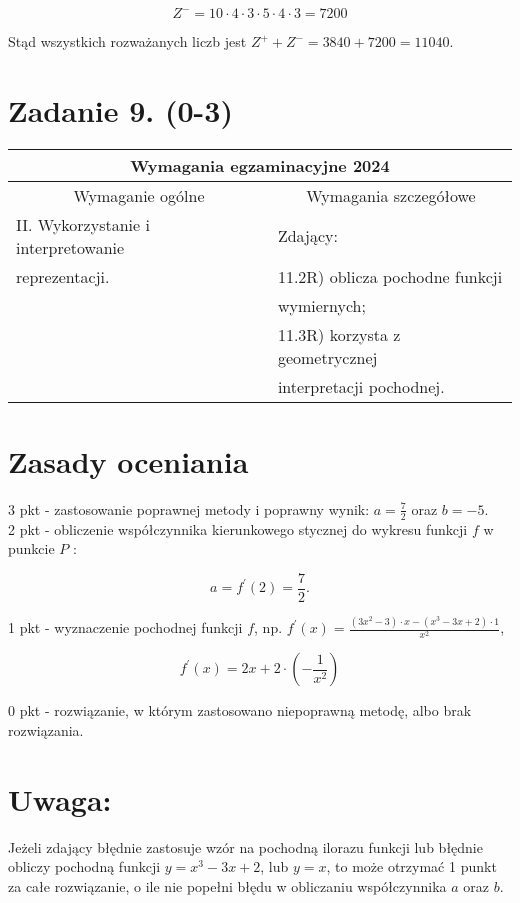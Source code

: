 \documentclass[10pt]{article}
\begin{document}
$$
Z^{-}=10 \cdot 4 \cdot 3 \cdot 5 \cdot 4 \cdot 3=7200
$$

Stąd wszystkich rozważanych liczb jest $Z^{+}+Z^{-}=3840+7200=11040$.

\section*{Zadanie 9. (0-3)}
\begin{center}
\begin{tabular}{|l|l|}
\hline
\multicolumn{2}{|c|}{Wymagania egzaminacyjne 2024} \\
\hline
\multicolumn{1}{|c|}{Wymaganie ogólne} & \multicolumn{1}{c|}{Wymagania szczegółowe} \\
\hline
II. Wykorzystanie i interpretowanie & Zdający: \\
reprezentacji. & 11.2R) oblicza pochodne funkcji \\
 & wymiernych; \\
 & 11.3R) korzysta z geometrycznej \\
 & interpretacji pochodnej. \\
\hline
\end{tabular}
\end{center}

\section*{Zasady oceniania}
3 pkt - zastosowanie poprawnej metody i poprawny wynik: $a=\frac{7}{2}$ oraz $b=-5$.\\
2 pkt - obliczenie współczynnika kierunkowego stycznej do wykresu funkcji $f$ w punkcie $P$ :

$$
a=f^{\prime}(2)=\frac{7}{2} .
$$

1 pkt - wyznaczenie pochodnej funkcji $f$, np. $f^{\prime}(x)=\frac{\left(3 x^{2}-3\right) \cdot x-\left(x^{3}-3 x+2\right) \cdot 1}{x^{2}}$,

$$
f^{\prime}(x)=2 x+2 \cdot\left(-\frac{1}{x^{2}}\right)
$$

0 pkt - rozwiązanie, w którym zastosowano niepoprawną metodę, albo brak rozwiązania.

\section*{Uwaga:}
Jeżeli zdający błędnie zastosuje wzór na pochodną ilorazu funkcji lub błędnie obliczy pochodną funkcji $y=x^{3}-3 x+2$, lub $y=x$, to może otrzymać 1 punkt za całe rozwiązanie, o ile nie popełni błędu w obliczaniu współczynnika $a$ oraz $b$.
\end{document}
